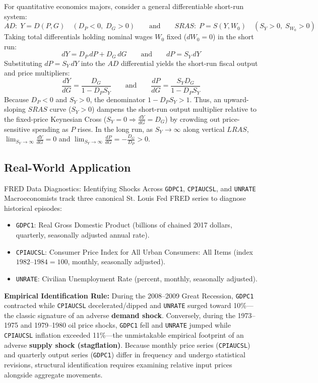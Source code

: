 \documentclass[11pt,letterpaper]{article}
\begin{document}
\begin{coreprinciple}
For quantitative economics majors, consider a general differentiable short-run system:
\[
AD: \; Y = D(P, G) \quad (D_P < 0, \; D_G > 0) \qquad\text{and}\qquad SRAS: \; P = S(Y, W_0) \quad (S_Y > 0, \; S_{W_0} > 0)
\]
Taking total differentials holding nominal wages $W_0$ fixed ($dW_0 = 0$) in the short run:
\[
dY = D_P \, dP + D_G \, dG \qquad\text{and}\qquad dP = S_Y \, dY
\]
Substituting $dP = S_Y \, dY$ into the $AD$ differential yields the short-run fiscal output and price multipliers:
\[
\frac{dY}{dG} = \frac{D_G}{1 - D_P S_Y} \qquad\text{and}\qquad \frac{dP}{dG} = \frac{S_Y D_G}{1 - D_P S_Y}
\]
Because $D_P < 0$ and $S_Y > 0$, the denominator $1 - D_P S_Y > 1$. Thus, an upward-sloping $SRAS$ curve ($S_Y > 0$) dampens the short-run output multiplier relative to the fixed-price Keynesian Cross ($S_Y = 0 \Rightarrow \frac{dY}{dG} = D_G$) by crowding out price-sensitive spending as $P$ rises. In the long run, as $S_Y \rightarrow \infty$ along vertical $LRAS$, $\lim_{S_Y \to \infty} \frac{dY}{dG} = 0$ and $\lim_{S_Y \to \infty} \frac{dP}{dG} = -\frac{D_G}{D_P} > 0$.
\end{coreprinciple}

\subsection*{Real-World Application}
\begin{examplecase}{FRED Data Diagnostics: Identifying Shocks Across \texttt{GDPC1}, \texttt{CPIAUCSL}, and \texttt{UNRATE}}
Macroeconomists track three canonical St. Louis Fed FRED series to diagnose historical episodes:
\begin{itemize}
    \item \texttt{GDPC1}: Real Gross Domestic Product (billions of chained 2017 dollars, quarterly, seasonally adjusted annual rate).
    \item \texttt{CPIAUCSL}: Consumer Price Index for All Urban Consumers: All Items (index $1982\text{--}1984 = 100$, monthly, seasonally adjusted).
    \item \texttt{UNRATE}: Civilian Unemployment Rate (percent, monthly, seasonally adjusted).
\end{itemize}
\textbf{Empirical Identification Rule:} During the 2008--2009 Great Recession, \texttt{GDPC1} contracted while \texttt{CPIAUCSL} decelerated/dipped and \texttt{UNRATE} surged toward 10\%—the classic signature of an adverse \textbf{demand shock}. Conversely, during the 1973--1975 and 1979--1980 oil price shocks, \texttt{GDPC1} fell and \texttt{UNRATE} jumped while \texttt{CPIAUCSL} inflation exceeded 11\%—the unmistakable empirical footprint of an adverse \textbf{supply shock (stagflation)}. Because monthly price series (\texttt{CPIAUCSL}) and quarterly output series (\texttt{GDPC1}) differ in frequency and undergo statistical revisions, structural identification requires examining relative input prices alongside aggregate movements.
\end{examplecase}
\end{document}
